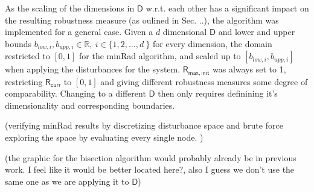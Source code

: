     As the scaling of the dimensions in $\mathsf{D}$ w.r.t. each other has a significant impact on the resulting robustness measure (as oulined in Sec. ..), the algorithm was implemented for a general case. Given a $d$ dimensional $\mathsf{D}$ and lower and upper bounds $b_{low,i}, b_{upp,i} \in \mathbb{R},\ i \in \{1,2,\ldots,d\ \}$ for every dimension, the domain restricted to $[0,1]$ for the minRad algorithm, and scaled up to $[b_{low,i}, b_{upp,i}]$ when applying the disturbances for the system. $\mathsf{R_{max,init}}$ was always set to 1, restricting $\mathsf{R_{curr}}$ to $[0,1]$ and giving different robustness measures some degree of comparability. 
    Changing to a different $\mathsf{D}$ then only requires definining it's dimensionality and corresponding boundaries.

    (verifying minRad results by discretizing disturbance space and brute force exploring the space by evaluating every single node. )

    (the graphic for the bisection algorithm would probably already be in previous work. I feel like it would be better located here?, also I guess we don't use the same one as we are applying it to $\mathsf{D}$)

    



